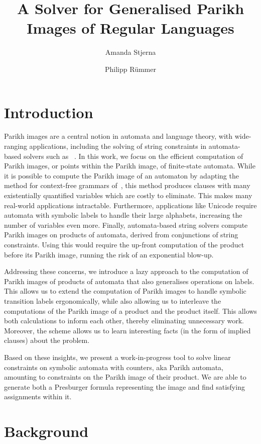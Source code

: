 \documentclass{easychair}
\title{A Solver for Generalised Parikh Images of Regular Languages}
\author{Amanda Stjerna \and Philipp Rümmer}
\institute{Uppsala University, Sweden}
\begin{document}
\maketitle

\section{Introduction}

Parikh images are a central notion in automata and language theory,
with wide-ranging applications, including the solving
of string constraints in automata-based solvers such as \Ostrich{}~\cite{ostrich}. In this work, we focus on the efficient computation
of Parikh images, or points within the Parikh image, of finite-state
automata. While it is possible to compute the Parikh image of an automaton
by adapting the method for context-free grammars
 of~\cite{generate-parikh-image}, this method
produces clauses with many existentially quantified variables which are costly
to eliminate. This makes many real-world applications intractable. Furthermore,
applications like Unicode require automata with symbolic labels to handle their
large alphabets, increasing the number of variables even more.
Finally, automata-based string solvers compute Parikh images on products of
automata, derived from conjunctions of string constraints. Using
\cite{generate-parikh-image} this would require the up-front computation of the
product before its Parikh image, running the risk of an exponential blow-up.

Addressing these concerns, we introduce a lazy approach to the computation of
Parikh images of products of automata that also generalises operations on
labels. This allows us to extend the computation of Parikh images to handle
symbolic transition labels ergonomically, while also allowing us to interleave
the computations of the Parikh image of a product and the product itself. This
allows both calculations to inform each other, thereby eliminating unnecessary
work. Moreover, the scheme allows us to learn interesting facts (in the form of
implied clauses) about the problem.

Based on these insights, we present a work-in-progress tool to solve linear
constraints on symbolic automata with counters, aka Parikh automata, amounting
to constraints on the Parikh image of their product. We are able to generate
both a Presburger formula representing the image and find satisfying assignments
within it.

\section{Background}
\end{document}
